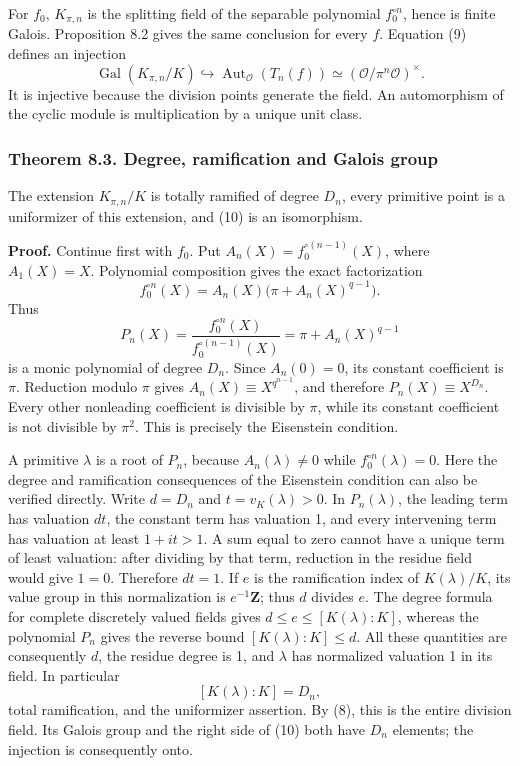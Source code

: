 \documentclass[11pt,a4paper]{article}
\begin{document}
For \(f_0\), \(K_{\pi,n}\) is the splitting field of the separable
polynomial \(f_0^{\circ n}\), hence is finite Galois. Proposition 8.2
gives the same conclusion for every \(f\). Equation (9) defines an
injection \[
\operatorname{Gal}(K_{\pi,n}/K)
 \hookrightarrow\operatorname{Aut}_{\mathcal O}(T_n(f))
 \simeq(\mathcal O/\pi^n\mathcal O)^\times.
\tag{10}
\] It is injective because the division points generate the field. An
automorphism of the cyclic module is multiplication by a unique unit
class.

\subsubsection{Theorem 8.3. Degree, ramification and Galois
group}\label{theorem-8.3.-degree-ramification-and-galois-group}

The extension \(K_{\pi,n}/K\) is totally ramified of degree \(D_n\),
every primitive point is a uniformizer of this extension, and (10) is an
isomorphism.

\textbf{Proof.} Continue first with \(f_0\). Put
\(A_n(X)=f_0^{\circ(n-1)}(X)\), where \(A_1(X)=X\). Polynomial
composition gives the exact factorization \[
f_0^{\circ n}(X)=A_n(X)\bigl(\pi+A_n(X)^{q-1}\bigr).
\] Thus \[
P_n(X)=\frac{f_0^{\circ n}(X)}{f_0^{\circ(n-1)}(X)}
       =\pi+A_n(X)^{q-1}
\tag{11}
\] is a monic polynomial of degree \(D_n\). Since \(A_n(0)=0\), its
constant coefficient is \(\pi\). Reduction modulo \(\pi\) gives
\(A_n(X)\equiv X^{q^{n-1}}\), and therefore \(P_n(X)\equiv X^{D_n}\).
Every other nonleading coefficient is divisible by \(\pi\), while its
constant coefficient is not divisible by \(\pi^2\). This is precisely
the Eisenstein condition.

A primitive \(\lambda\) is a root of \(P_n\), because
\(A_n(\lambda)\ne0\) while \(f_0^{\circ n}(\lambda)=0\). Here the degree
and ramification consequences of the Eisenstein condition can also be
verified directly. Write \(d=D_n\) and \(t=v_K(\lambda)>0\). In
\(P_n(\lambda)\), the leading term has valuation \(dt\), the constant
term has valuation 1, and every intervening term has valuation at least
\(1+it>1\). A sum equal to zero cannot have a unique term of least
valuation: after dividing by that term, reduction in the residue field
would give \(1=0\). Therefore \(dt=1\). If \(e\) is the ramification
index of \(K(\lambda)/K\), its value group in this normalization is
\(e^{-1}\mathbf Z\); thus \(d\) divides \(e\). The degree formula for
complete discretely valued fields gives \(d\leq e\leq[K(\lambda):K]\),
whereas the polynomial \(P_n\) gives the reverse bound
\([K(\lambda):K]\leq d\). All these quantities are consequently \(d\),
the residue degree is 1, and \(\lambda\) has normalized valuation 1 in
its field. In particular \[
[K(\lambda):K]=D_n,
\] total ramification, and the uniformizer assertion. By (8), this is
the entire division field. Its Galois group and the right side of (10)
both have \(D_n\) elements; the injection is consequently onto.
\end{document}
